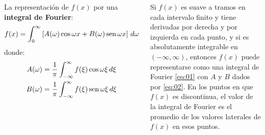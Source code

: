 \documentclass[9pt, aspectratio=169]{beamer}
\begin{document}
\begin{frame}
\begin{columns}[t]
\cx
La representación de $f(x)$ por una \textbf{integral de Fourier}:
\begin{equation}
f(x) = \int_0^{\infty} \left[ A(\omega) \cos \omega x + B(\omega) \operatorname{sen} \omega x \right] \, d\omega 
\label{eq:01}
\end{equation}
donde:
\begin{equation}
    \begin{split}
    A(\omega) &= \frac{1}{\pi} \int_{-\infty}^{\infty} f(\xi) \cos \omega \xi \, d\xi \\
    B(\omega) &= \frac{1}{\pi} \int_{-\infty}^{\infty} f(\xi) \operatorname{sen} \omega \xi \, d\xi \\
    \end{split}
    \label{eq:02}
\end{equation}
\cx
\begin{theorem}
    Si $f(x)$ es suave a tramos en cada intervalo finito y tiene derivadas por derecha y por izquierda en cada punto, y si es absolutamente integrable en $(-\infty, \infty)$, entonces $f(x)$ puede representarse como una integral de Fourier \eqref{eq:01} con $A$ y $B$ dados por \eqref{eq:02}. En los puntos en que $f(x)$ es discontinua, el valor de la integral de Fourier es el promedio de los valores laterales de $f(x)$ en esos puntos.
\end{theorem}
\end{columns}
\end{frame}
\end{document}
